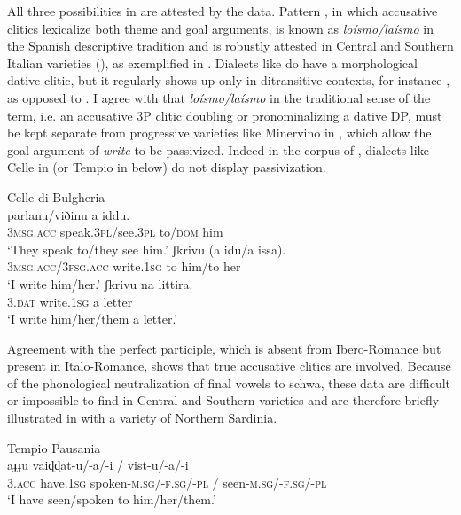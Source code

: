 \documentclass[output=paper,colorlinks,citecolor=brown,modfonts,nonflat]{langsci/langscibook}
\begin{document}
All three possibilities in  are attested by the data. Pattern , in which accusative clitics lexicalize both theme and goal arguments, is known as \textit{loísmo/laísmo} in the Spanish descriptive tradition and is robustly attested in Central and Southern Italian varieties (\citealt[§633]{Rohlfs1969}), as exemplified in . Dialects like  do have a morphological dative clitic, but it regularly shows up only in ditransitive contexts, for instance , as opposed to . I agree with \citet{Pineda2016} that \textit{loísmo/laísmo} in the traditional sense of the term, i.e. an accusative 3P clitic doubling or pronominalizing a dative DP, must be kept separate from progressive varieties like Minervino in , which allow the goal argument of \textit{write} to be passivized. Indeed in the corpus of \citet{ManziniSavoia2005}, dialects like Celle in  (or Tempio in  below) do not display passivization.

\ea%
    \label{ex:manzini:21}
    Celle di Bulgheria \citep{ManziniSavoia2005}\\
    \ea\label{ex:manzini:21a}
        {parlanu/viðinu}   {a}   {iddu}.\\
        \textsc{3msg.acc}  speak.\textsc{3pl}/see.\textsc{3pl} to/\textsc{dom} him\\
    \glt ‘They speak to/they see him.’
    \ex\label{ex:manzini:21b}
           {ʃkrivu}     (a {idu/a} issa).\\
        \textsc{3msg.acc/3fsg.acc} write.\textsc{1sg}   to him/to her\\
    \glt ‘I write him/her.’
    \ex\label{ex:manzini:21c}
       {ʃkrivu}     {na} {littira}.\\
        \textsc{3.dat}   write.\textsc{1sg}   a letter\\
    \glt ‘I write him/her/them a letter.’
    \z
\z


Agreement with the perfect participle, which is absent from Ibero-Romance but present in Italo-Romance, shows that true accusative clitics are involved. Because of the phonological neutralization of final vowels to schwa, these data are difficult or impossible to find in Central and Southern varieties and are therefore briefly illustrated in  with a variety of Northern Sardinia.

\ea%
    \label{ex:manzini:22}
    Tempio Pausania \citep{ManziniSavoia2005}\\
        {aɟɟu}     {vaiɖɖat-u/-a/-i}  /  {vist-u/-a/-i}\\
        \textsc{3.acc}  have.\textsc{1sg}   spoken-\textsc{m.sg/-f.sg/-pl} / seen-\textsc{m.sg/-f.sg/-pl}\\
    \glt ‘I have seen/spoken to him/her/them.’
\z
\end{document}
